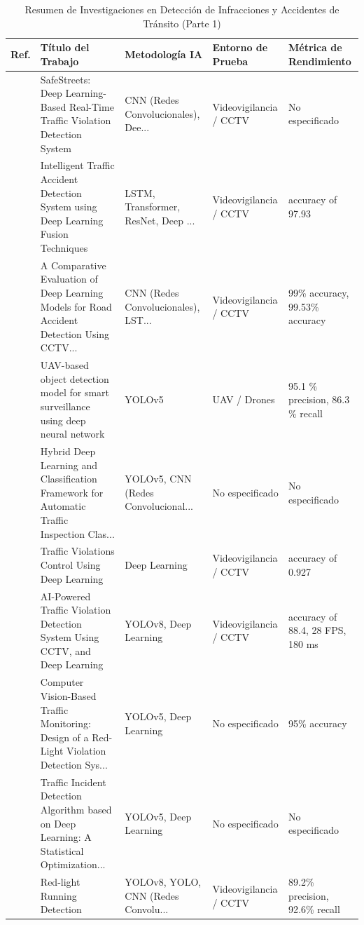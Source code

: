 \begin{table}[htbp]
\centering
\renewcommand{\arraystretch}{1.1}
\caption{Resumen de Investigaciones en Detección de Infracciones y Accidentes de Tránsito (Parte 1)}
\label{tab:articulos_transporte_1}
\footnotesize
\begin{tabular}{cp{7.5cm}p{2.8cm}p{2.8cm}p{2.8cm}}
\toprule
\textbf{Ref.} & \textbf{Título del Trabajo} & \textbf{Metodología IA} & \textbf{Entorno de Prueba} & \textbf{Métrica de Rendimiento} \\
\midrule
\cite{l2026safestreets} & SafeStreets: Deep Learning-Based Real-Time Traffic Violation Detection System & CNN (Redes Convolucionales), Dee... & Videovigilancia / CCTV & No especificado \\
\cite{kumar2026intelligent} & Intelligent Traffic Accident Detection System using Deep Learning Fusion Techniques & LSTM, Transformer, ResNet, Deep ... & Videovigilancia / CCTV & accuracy of 97.93 \\
\cite{ahmad2026comparative} & A Comparative Evaluation of Deep Learning Models for Road Accident Detection Using CCTV... & CNN (Redes Convolucionales), LST... & Videovigilancia / CCTV & 99\% accuracy, 99.53\% accuracy \\
\cite{kumar2026uavbased} & UAV-based object detection model for smart surveillance using deep neural network & YOLOv5 & UAV / Drones & 95.1 \% precision, 86.3 \% recall \\
\cite{chen2026hybrid} & Hybrid Deep Learning and Classification Framework for Automatic Traffic Inspection Clas... & YOLOv5, CNN (Redes Convolucional... & No especificado & No especificado \\
\cite{srivastava2026traffic} & Traffic Violations Control Using Deep Learning & Deep Learning & Videovigilancia / CCTV & accuracy of 0.927 \\
\cite{pavan2026aipowered} & AI-Powered Traffic Violation Detection System Using CCTV, and Deep Learning & YOLOv8, Deep Learning & Videovigilancia / CCTV & accuracy of 88.4, 28 FPS, 180 ms \\
\cite{yang2025computer} & Computer Vision-Based Traffic Monitoring: Design of a Red-Light Violation Detection Sys... & YOLOv5, Deep Learning & No especificado & 95\% accuracy \\
\cite{jing2025traffic} & Traffic Incident Detection Algorithm based on Deep Learning: A Statistical Optimization... & YOLOv5, Deep Learning & No especificado & No especificado \\
\cite{le2025redlight} & Red-light Running Detection & YOLOv8, YOLO, CNN (Redes Convolu... & Videovigilancia / CCTV & 89.2\% precision, 92.6\% recall \\

\end{tabular}
\end{table}
